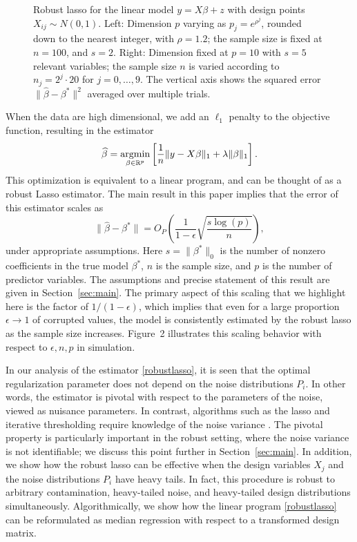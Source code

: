 \begin{figure}[t]
\begin{center}
\begin{tabular}{cc}
    \end{tabular}
  \end{center}
\caption{Robust lasso for the linear model  $y=X\beta + z$ with design points $X_{ij}\sim N(0,1)$.
Left: Dimension $p$ varying as $p_{j} = e^{\rho^j}$, rounded down to the nearest integer, with $\rho=1.2$; the sample size is fixed at $n=100$, and $s=2$. Right: Dimension fixed at $p=10$ with $s=5$ relevant variables; the sample size $n$ is varied according to
$n_j = 2^j \cdot 20$ for $j=0,\ldots, 9$. The vertical axis shows the squared error $\|\hat \beta - \beta^*\|^2$ averaged over multiple trials.}
\end{figure}

When the data are high dimensional, we add an $\ell_1$ penalty to the objective function, resulting in the estimator
\begin{equation}
  \wh{\beta}=\argmin_{\beta\in\mathbb{R}^p}\left[\frac{1}{n}\|y-X\beta\|_1+\lambda\|\beta\|_1\right].
  \label{robustlasso}
\end{equation}
This optimization is equivalent to a linear program, and can be thought of as a robust Lasso estimator. The main result in this paper implies that the error of this estimator scales as
\begin{equation}
  \|\hat \beta - \beta^*\|  = O_P\left(\frac{1}{1-\epsilon} \sqrt{\frac{s\log(p)}{n}}\right),
\end{equation}
under appropriate assumptions.
Here $s = \|\beta^*\|_0$ is the number of nonzero coefficients in the true model $\beta^*$, $n$ is the sample size, and $p$ is the number of predictor variables. The assumptions and precise statement of this result are given in Section~\ref{sec:main}. The primary aspect of this scaling that we highlight here is the factor of $1/(1-\epsilon)$, which implies that even for a large proportion $\epsilon \to 1$ of corrupted values, the model is consistently estimated by the robust lasso as the sample size increases. Figure~2 illustrates this scaling behavior with respect to $\epsilon, n, p$ in simulation.

In our analysis of the estimator \eqref{robustlasso}, it is seen that the optimal regularization parameter does not depend on the noise distributions $P_i$. In other words, the
estimator is pivotal with respect to the parameters of the noise, viewed as nuisance parameters.
In contrast, algorithms such as the lasso and iterative thresholding  require knowledge of the noise variance \citep{bickel2009simultaneous,suggala2019adaptive}.
The pivotal property is particularly important in the robust setting, where the
noise variance is not identifiable; we discuss this point further in Section~\ref{sec:main}.
In addition, we show how the robust lasso can be effective when the design variables $X_j$ and the noise distributions $P_i$ have heavy tails.
In fact, this procedure is robust to arbitrary contamination, heavy-tailed noise, and heavy-tailed design distributions simultaneously. Algorithmically, we show how the linear program \eqref{robustlasso} can be reformulated as median regression with respect to a transformed design matrix.

